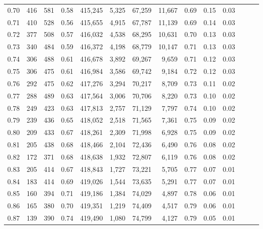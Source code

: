 \begin{tabular}{rrrrrrrrrrrrrr}
0.70 &     416 &    581 &  0.58 &  415,245 &    5,325 &  67,259 &  11,667 &  0.69 &  0.15 &      0.03 \\
0.71 &     410 &    528 &  0.56 &  415,655 &    4,915 &  67,787 &  11,139 &  0.69 &  0.14 &      0.03 \\
0.72 &     377 &    508 &  0.57 &  416,032 &    4,538 &  68,295 &  10,631 &  0.70 &  0.13 &      0.03 \\
0.73 &     340 &    484 &  0.59 &  416,372 &    4,198 &  68,779 &  10,147 &  0.71 &  0.13 &      0.03 \\
0.74 &     306 &    488 &  0.61 &  416,678 &    3,892 &  69,267 &   9,659 &  0.71 &  0.12 &      0.03 \\
0.75 &     306 &    475 &  0.61 &  416,984 &    3,586 &  69,742 &   9,184 &  0.72 &  0.12 &      0.03 \\
0.76 &     292 &    475 &  0.62 &  417,276 &    3,294 &  70,217 &   8,709 &  0.73 &  0.11 &      0.02 \\
0.77 &     288 &    489 &  0.63 &  417,564 &    3,006 &  70,706 &   8,220 &  0.73 &  0.10 &      0.02 \\
0.78 &     249 &    423 &  0.63 &  417,813 &    2,757 &  71,129 &   7,797 &  0.74 &  0.10 &      0.02 \\
0.79 &     239 &    436 &  0.65 &  418,052 &    2,518 &  71,565 &   7,361 &  0.75 &  0.09 &      0.02 \\
0.80 &     209 &    433 &  0.67 &  418,261 &    2,309 &  71,998 &   6,928 &  0.75 &  0.09 &      0.02 \\
0.81 &     205 &    438 &  0.68 &  418,466 &    2,104 &  72,436 &   6,490 &  0.76 &  0.08 &      0.02 \\
0.82 &     172 &    371 &  0.68 &  418,638 &    1,932 &  72,807 &   6,119 &  0.76 &  0.08 &      0.02 \\
0.83 &     205 &    414 &  0.67 &  418,843 &    1,727 &  73,221 &   5,705 &  0.77 &  0.07 &      0.01 \\
0.84 &     183 &    414 &  0.69 &  419,026 &    1,544 &  73,635 &   5,291 &  0.77 &  0.07 &      0.01 \\
0.85 &     160 &    394 &  0.71 &  419,186 &    1,384 &  74,029 &   4,897 &  0.78 &  0.06 &      0.01 \\
0.86 &     165 &    380 &  0.70 &  419,351 &    1,219 &  74,409 &   4,517 &  0.79 &  0.06 &      0.01 \\
0.87 &     139 &    390 &  0.74 &  419,490 &    1,080 &  74,799 &   4,127 &  0.79 &  0.05 &      0.01 \\

\end{tabular}
